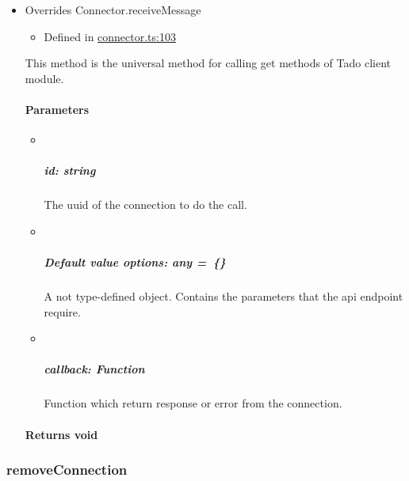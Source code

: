 \documentclass[]{article}
\providecommand{\tightlist}{%
  \setlength{\itemsep}{0pt}\setlength{\parskip}{0pt}}
\let\oldparagraph\paragraph
\renewcommand{\paragraph}[1]{\oldparagraph{#1}\mbox{}}
\let\oldsubparagraph\subparagraph
\renewcommand{\subparagraph}[1]{\oldsubparagraph{#1}\mbox{}}
\begin{document}
\begin{itemize}
\item
  Overrides Connector.receiveMessage

  \begin{itemize}
  \tightlist
  \item
    Defined in
    \href{https://github.com/BFMBFramework/TadoConnector/blob/f05932b/src/connector.ts\#L103}{connector.ts:103}
  \end{itemize}

  This method is the universal method for calling get methods of Tado
  client module.

  \hypertarget{parameters-6}{%
  \paragraph{Parameters}\label{parameters-6}}

  \begin{itemize}
  \item ~
    \hypertarget{id-string-3}{%
    \subparagraph{\texorpdfstring{id:
    {string}}{id: string}}\label{id-string-3}}

    The uuid of the connection to do the call.
  \item ~
    \hypertarget{default-value-options-any-1}{%
    \subparagraph{\texorpdfstring{{Default value} options: {any}{
    =~\{\}}}{Default value options: any =~\{\}}}\label{default-value-options-any-1}}

    A not type-defined object. Contains the parameters that the api
    endpoint require.
  \item ~
    \hypertarget{callback-function-4}{%
    \subparagraph{\texorpdfstring{callback:
    {Function}}{callback: Function}}\label{callback-function-4}}

    Function which return response or error from the connection.
  \end{itemize}

  \hypertarget{returns-void-4}{%
  \paragraph{\texorpdfstring{Returns
  {void}}{Returns void}}\label{returns-void-4}}
\end{itemize}

\protect\hypertarget{removeconnection}{}{}

\hypertarget{removeconnection}{%
\subsubsection{removeConnection}\label{removeconnection}}
\end{document}

